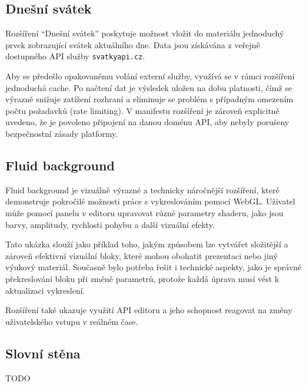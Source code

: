 \subsection{Dnešní svátek}

Rozšíření \enquote{Dnešní svátek} poskytuje možnost vložit do materiálu jednoduchý prvek zobrazující svátek aktuálního dne. 
Data jsou získávána z veřejně dostupného API služby \texttt{svatkyapi.cz}.

Aby se předešlo opakovanému volání externí služby, využívá se v rámci rozšíření jednoduchá cache. 
Po načtení dat je výsledek uložen na dobu platnosti, čímž se výrazně snižuje zatížení rozhraní a eliminuje se problém s případným omezením počtu požadavků (rate limiting).
V manifestu rozšíření je zároveň explicitně uvedeno, že je povoleno připojení na danou doménu API, aby nebyly porušeny bezpečnostní zásady platformy.

\subsection{Fluid background}

Fluid background je vizuálně výrazné a technicky náročnější rozšíření, které demonstruje pokročilé možnosti práce s vykreslováním pomocí WebGL.
Uživatel může pomocí panelu v editoru upravovat různé parametry shaderu, jako jsou barvy, amplitudy, rychlosti pohybu a další vizuální efekty.

Tato ukázka slouží jako příklad toho, jakým způsobem lze vytvářet složitější a zároveň efektivní vizuální bloky, které mohou obohatit prezentaci nebo jiný výukový materiál. 
Současně bylo potřeba řešit i technické aspekty, jako je správné překreslování bloku při změně parametrů, protože každá úprava musí vést k aktualizaci vykreslení.

Rozšíření také ukazuje využití API editoru a jeho schopnost reagovat na změny uživatelského vstupu v reálném čase.

\subsection{Slovní stěna}

TODO



